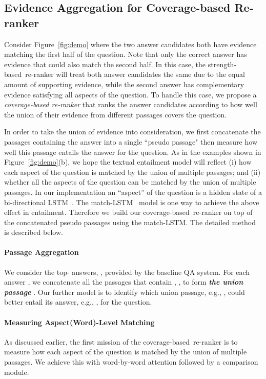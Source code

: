 \documentclass{article} \usepackage{iclr2018_conference,times}
\def \coherence {strength-based}
\def \union {coverage-based}
\begin{document}
\subsection{Evidence Aggregation for Coverage-based Re-ranker}
\label{sec:method_union}
Consider Figure~\ref{fig:demo} where the two answer candidates both have evidence matching the first half of the question. Note that only the correct answer has evidence that could also match the second half. In this case, the \coherence\ re-ranker will treat both answer candidates the same due to the equal amount of supporting evidence, while the second answer has complementary evidence satisfying all aspects of the question. To handle this case, we propose a \emph{coverage-based re-ranker} that ranks the answer candidates according to how well the union of their evidence from different passages covers the question.

In order to take the union of evidence into consideration, we first concatenate the passages containing the answer into a single ``pseudo passage" then  measure how well this passage entails the answer for the question. As in the examples shown in Figure~\ref{fig:demo}(b), we hope the textual entailment model will reflect (i) how each aspect of the question is matched by the union of multiple passages; and (ii) whether all the aspects of the question can be matched by the union of multiple passages. In our implementation an ``aspect'' of the question is a hidden state of a bi-directional LSTM~\citep{hochreiter1997long}. The match-LSTM~\citep{wang2015learning:NAACL2016} model is one way to achieve the above effect in entailment. Therefore we build our \union\ re-ranker on top of the concatenated pseudo passages using the match-LSTM. The detailed method is described below.

\paragraph{Passage Aggregation} We consider the top- answers, , provided by the baseline QA system. For each answer , we concatenate all the passages that contain , ,  to form \textbf{\emph{the union passage}} . 
Our further model is to identify which union passage, e.g., , could better entail its answer, e.g., , for the question. 

\paragraph{Measuring Aspect(Word)-Level Matching}
As discussed earlier, the first mission of the \union\ re-ranker is to measure how each aspect of the question is matched by the union of multiple passages. We achieve this with word-by-word attention followed by a comparison module.
\end{document}
